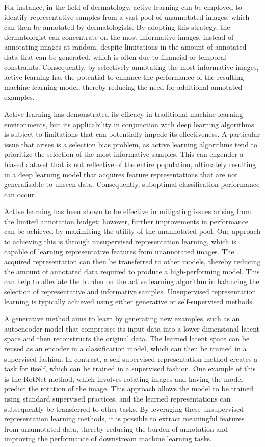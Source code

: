 For instance, in the field of dermatology, active learning can be employed to identify representative samples from a vast pool of unannotated images, which can then be annotated by dermatologists. By adopting this strategy, the dermatologist can concentrate on the most informative images, instead of annotating images at random, despite limitations in the amount of annotated data that can be generated, which is often due to financial or temporal constraints. Consequently, by selectively annotating the most informative images, active learning has the potential to enhance the performance of the resulting machine learning model, thereby reducing the need for additional annotated examples.

Active learning has demonstrated its efficacy in traditional machine learning environments, but its applicability in conjunction with deep learning algorithms is subject to limitations that can potentially impede its effectiveness. A particular issue that arises is a selection bias problem, as active learning algorithms tend to prioritize the selection of the most informative samples. This can engender a biased dataset that is not reflective of the entire population, ultimately resulting in a deep learning model that acquires feature representations that are not generalisable to unseen data. Consequently, suboptimal classification performance can occur.

Active learning has been shown to be effective in mitigating issues arising from the limited annotation budget; however, further improvements in performance can be achieved by maximising the utility of the unannotated pool. One approach to achieving this is through unsupervised representation learning, which is capable of learning representative features from unannotated images. The acquired representation can then be transferred to other models, thereby reducing the amount of annotated data required to produce a high-performing model. This can help to alleviate the burden on the active learning algorithm in balancing the selection of representative and informative samples. Unsupervised representation learning is typically achieved using either generative or self-supervised methods.

A generative method aims to learn by generating new examples, such as an autoencoder model that compresses its input data into a lower-dimensional latent space and then reconstructs the original data. The learned latent space can be reused as an encoder in a classification model, which can then be trained in a supervised fashion. In contrast, a self-supervised representation method creates a task for itself, which can be trained in a supervised fashion. One example of this is the RotNet method, which involves rotating images and having the model predict the rotation of the image. This approach allows the model to be trained using standard supervised practices, and the learned representations can subsequently be transferred to other tasks. By leveraging these unsupervised representation learning methods, it is possible to extract meaningful features from unannotated data, thereby reducing the burden of annotation and improving the performance of downstream machine learning tasks.


